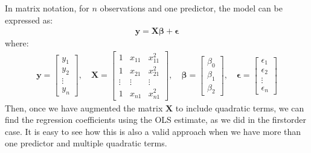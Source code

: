 \documentclass[letterpaper,10pt,english]{jupyterBook}
\begin{document}
\sphinxAtStartPar
In matrix notation, for \(n\) observations and one predictor, the model can be expressed as:
\begin{equation*}
\begin{split}
\mathbf{y} = \mathbf{X} \boldsymbol{\beta} + \boldsymbol{\epsilon}
\end{split}
\end{equation*}
\sphinxAtStartPar
where:
\begin{equation*}
\begin{split}
\mathbf{y} = \begin{bmatrix} y_1 \\ y_2 \\ \vdots \\ y_n \end{bmatrix}, \quad \mathbf{X} = \begin{bmatrix} 1 & x_{11} & x_{11}^2 \\ 1 & x_{21} & x_{21}^2 \\ \vdots & \vdots & \vdots \\ 1 & x_{n1} & x_{n1}^2 \end{bmatrix}, \quad \boldsymbol{\beta} = \begin{bmatrix} \beta_0 \\ \beta_1 \\ \beta_2 \end{bmatrix}, \quad \boldsymbol{\epsilon} = \begin{bmatrix} \epsilon_1 \\ \epsilon_2 \\ \vdots \\ \epsilon_n \end{bmatrix}
\end{split}
\end{equation*}
\sphinxAtStartPar
Then, once we have augmented the matrix \(\mathbf{X}\) to include quadratic terms, we can find the regression coefficients using the OLS estimate, as we did in the first\sphinxhyphen{}order case. It is easy to see how this is also a valid approach when we have more than one predictor and multiple quadratic terms.
\end{document}
